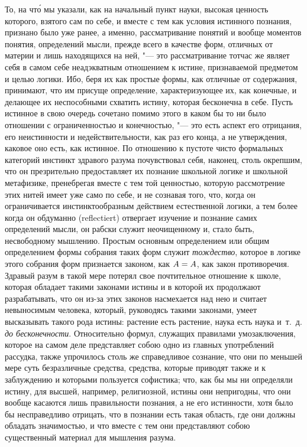То, на чт\'{о} мы указали, как на начальный пункт науки, высокая ценность
которого, взятого сам по себе, и вместе с тем как условия истинного познания,
признано было уже ранее, а именно, рассматривание понятий и вообще моментов
понятия, определений мысли, прежде всего в качестве форм, отличных от материи и
лишь находящихся на ней, "--- это рассматривание тотчас же являет себя в самом
себе неадэкватным отношением к истине, признаваемой предметом и целью логики.
Ибо, беря их как простые формы, как отличные от содержания, принимают, что им
присуще определение, характеризующее их, как конечные, и делающее их
неспособными схватить истину, которая бесконечна в себе. Пусть истинное в свою
очередь сочетано помимо этого в каком бы то ни было отношении с ограниченностью
и конечностью, "--- это есть аспект его отрицания, его неистинности и
недействительности, как раз его конца, а не утверждения, каковое оно есть, как
истинное. По отношению к пустоте чисто формальных категорий инстинкт здравого
разума почувствовал себя, наконец, столь окрепшим, что он презрительно
предоставляет их познание школьной логике и школьной метафизике, пренебрегая
вместе с тем той ценностью, которую рассмотрение этих нитей имеет уже само по
себе, и не сознавая того, что, когда он ограничивается инстинктообразным
действием естественной логики, а тем более когда он обдуманно (reflectiert)
отвергает изучение и познание самих определений мысли, он рабски служит
неочищенному и, стало быть, несвободному мышлению. Простым основным
определением или общим определением формы собрания таких форм служит
{\em тождество}, которое в логике этого собрания форм признается законом, как
$A\hm=A$, как закон противоречия. Здравый разум в такой мере потерял свое
почтительное отношение к школе, которая обладает такими законами истины и в
которой их продолжают разрабатывать, что он из-за этих законов насмехается над
нею и считает невыносимым человека, который, руководясь такими законами, умеет
высказывать такого рода истины: растение есть растение, наука есть наука
и~т.~д. {\em до бесконечности}. Относительно формул, служащих правилами
умозаключения, которое на самом деле представляет собою одно из главных
употреблений рассудка, также упрочилось столь же справедливое сознание, что они
по меньшей мере суть безразличные средства, средства, которые приводят также и
к заблуждению и которыми пользуется софистика; что, как бы мы ни определяли
истину, для высшей, например, религиозной, истины они непригодны, что они
вообще касаются лишь правильности познания, а не его истинности, хотя было бы
несправедливо отрицать, что в познании есть такая область, где они должны
обладать значимостью, и что вместе с тем они представляют собою существенный
материал для мышления разума.

